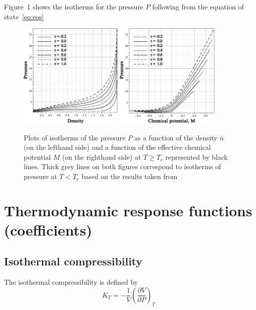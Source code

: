 \documentclass[12pt]{article}
\begin{document}
	Figure~1 shows the isotherms for the pressure $P$ following from the equation of state~\ref{eq:eos}
	\begin{figure}[h!]
		\includegraphics[width=0.446\textwidth]{f1a1.pdf} 
		\includegraphics[width=0.45\textwidth]{f1b1.pdf} 
		\vskip-3mm\caption{Plots of isotherms of the pressure $P$ as a function of the density $\bar n$ (on the lefthand side) and a function of the effective chemical potential $M$ (on the righthand side) at $T \geq T_c$ represented by black lines. Thick grey lines on both figures correspond to isotherms of pressure at $T < T_c$ based on the results taken from~\cite{KozlovskiiDobush2020}. 
		}\label{fig1}
	\end{figure}
	
	\section{Thermodynamic response functions (coefficients)}
	
	\subsection{Isothermal compressibility}
	The isothermal compressibility is defined by
	\begin{equation}
		\label{def:isotherm_compres}
		K_T = -\frac{1}{V}\left(\frac{\partial V}{\partial P}\right)_T
	\end{equation}
	
\end{document}
